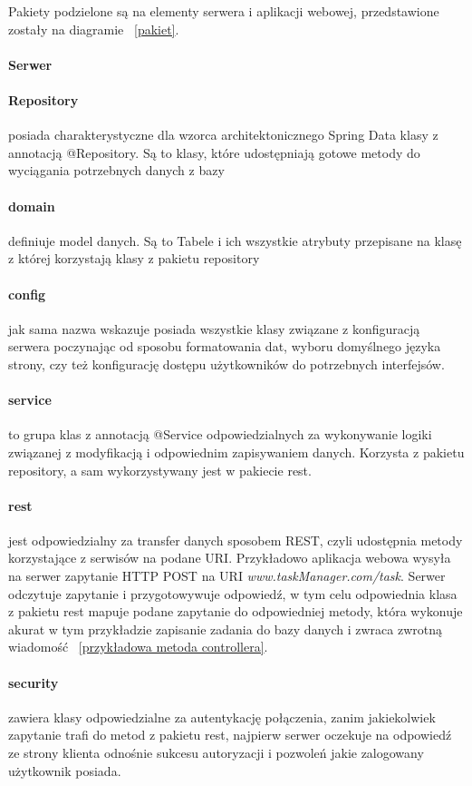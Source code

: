 Pakiety podzielone są na elementy serwera i aplikacji webowej, przedstawione zostały na diagramie ~\ref{pakiet}.
\paragraph{Serwer }
\paragraph{Repository}
 posiada charakterystyczne dla wzorca architektonicznego Spring Data klasy z annotacją @Repository. Są to klasy, które udostępniają gotowe metody do
wyciągania potrzebnych danych z bazy

\paragraph{domain}

 definiuje model danych. Są to Tabele i ich wszystkie atrybuty przepisane na klasę z której korzystają klasy z pakietu repository
\paragraph{config}
 jak sama nazwa wskazuje posiada wszystkie klasy związane z konfiguracją serwera poczynając od sposobu formatowania dat, wyboru domyślnego języka strony, czy też konfigurację dostępu użytkowników do potrzebnych interfejsów.
\paragraph{service}  to grupa klas z annotacją @Service odpowiedzialnych za wykonywanie logiki związanej z modyfikacją i odpowiednim zapisywaniem danych. Korzysta z pakietu repository, a sam wykorzystywany jest w pakiecie rest.
\paragraph{rest}  jest odpowiedzialny za transfer danych sposobem REST, czyli udostępnia  metody korzystające z serwisów na podane URI. Przykładowo aplikacja webowa wysyła na serwer zapytanie HTTP POST na URI
\textit{www.taskManager.com/task}. Serwer odczytuje zapytanie i przygotowywuje odpowiedź, w tym celu odpowiednia klasa z pakietu rest mapuje podane zapytanie do odpowiedniej metody, która wykonuje akurat w tym przykładzie zapisanie zadania do bazy danych i zwraca zwrotną wiadomość ~\ref{przykładowa metoda controllera}.

\paragraph{security} zawiera klasy odpowiedzialne za autentykację połączenia, zanim jakiekolwiek zapytanie trafi do metod z pakietu rest, najpierw serwer oczekuje na odpowiedź ze strony klienta odnośnie sukcesu autoryzacji i pozwoleń jakie zalogowany użytkownik posiada.

